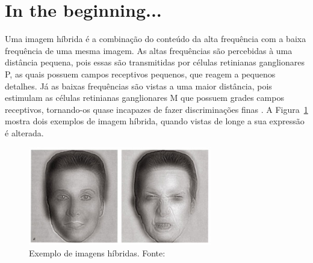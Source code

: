   

\section*{In the beginning...}
Uma imagem híbrida é a combinação do conteúdo da alta frequência com a baixa frequência de uma mesma imagem. As altas frequências são percebidas à uma distância pequena, pois essas são transmitidas por células retinianas ganglionares P, as quais possuem campos receptivos pequenos, que reagem a pequenos detalhes. Já as baixas frequências são vistas a uma maior distância, pois estimulam as células retinianas ganglionares M que possuem grades campos receptivos, tornando-os quase incapazes de fazer discriminações finas \cite{hibrid}. A Figura~\ref{fig:hibrid} mostra dois exemplos de imagem híbrida, quando vistas de longe a sua expressão é alterada.

\begin{figure}[h]
    \centering
    \includegraphics[width=8cm]{hibrid.jpg}
    \caption{Exemplo de imagens híbridas. Fonte: \cite{hibrid}}
    \label{fig:hibrid}
\end{figure}
               
